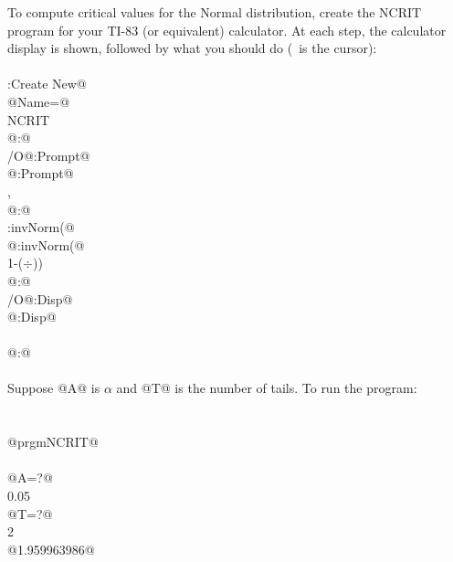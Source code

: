 \documentclass[dvipsnames,usenames]{report}
\begin{document}
To compute critical values for the Normal distribution, create the
NCRIT program for your TI-83 (or equivalent) calculator.  At each step, the 
calculator display is shown, followed by what you should do (\Rect\ is the 
cursor):\\
\Rect\\
\Prgm\to@NEW@{}:Create New@\\
@Name=@\Rect\\
NCRIT\Enter\\
@:@\Rect\\
\Prgm\to@I/O@:Prompt@\\
@:Prompt@ \Rect\\
\Alpha[A],\Alpha[T]\Enter\\
@:@\Rect\\
\Distr\to@DISTR@{}:invNorm(@\\
@:invNorm(@\Rect\\
1-(\Alpha[A]$\div$\Alpha[T]))\Sto\Alpha[C]\Enter\\
@:@\Rect\\
\Prgm\to@I/O@:Disp@\\
@:Disp@ \Rect\\
\Alpha[C]\Enter\\
@:@\Rect\\
\Quit\\

Suppose @A@ is $\alpha$ and @T@ is the number of tails.  To run the program:\\
\Rect\\
\Prgm\to@EXEC@\to@NCRIT@\\
@prgmNCRIT@\Rect\\
\Enter\\
@A=?@\Rect\\
0.05\Enter\\
@T=?@\Rect\\
2\Enter\\
@1.959963986@
\end{document}

